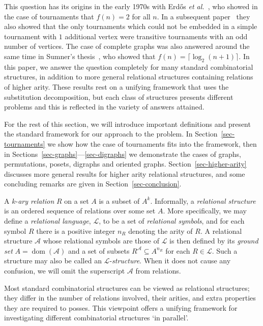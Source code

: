 \documentclass[11pt]{article}
\begin{document}
This question has its origins in the early 1970s with Erd\H{o}s {\itshape et al.}~\cite{erdos:some-remarks-on:}, who showed in the case of tournaments that $f(n)=2$ for all $n$. In a subsequent paper~\cite{erdos:simple-one-poin:} they also showed that the only tournaments which could not be embedded in a simple tournament with $1$ additional vertex were transitive tournaments with an odd number of vertices. The case of complete graphs was also answered around the same time in Sumner's thesis~\cite{sumner:indecomposable-:}, who showed that $f(n)=\lceil\log_2(n+1)\rceil$. In this paper, we answer the question completely for many standard combinatorial structures, in addition to more general relational structures containing relations of higher arity. These results rest on a unifying framework that uses the substitution decomposition, but each class of structures presents different problems and this is reflected in the variety of answers attained.

For the rest of this section, we will introduce important definitions and present the standard framework for our approach to the problem. In Section~\ref{sec-tournaments} we show how the case of tournaments fits into the framework, then in Sections~\ref{sec-graphs}---\ref{sec-digraphs} we demonstrate the cases of graphs, permutations, posets, digraphs and oriented graphs. Section~\ref{sec-higher-arity} discusses more general results for higher arity relational structures, and some concluding remarks are given in Section~\ref{sec-conclusion}.

A $k$-\emph{ary relation} $R$ on a set $A$ is a subset of $A^k$. Informally, a \emph{relational structure} is an ordered sequence of relations over some set $A$.
More specifically, we may define a \emph{relational language},
$\mathcal{L}$, to be a set of \emph{relational symbols}, and for each symbol $R$ there is a positive integer $n_R$ denoting the arity of $R$. A relational structure
$\mathcal{A}$ whose relational symbols are those of $\mathcal{L}$ is then
defined by its \emph{ground set} $A={\operatorname{dom}}(\mathcal{A})$ and a set of subsets
$R^\mathcal{A}\subseteq A^{n_R}$ for each $R\in
\mathcal{L}$. Such a structure may also be called an
$\mathcal{L}$-\emph{structure}. When it does not cause any confusion, we will omit the superscript $\mathcal{A}$ from relations.

Most standard combinatorial structures can be viewed as relational structures;
they differ in the number of relations involved, their arities, and extra properties they are required to posses. This viewpoint offers a unifying framework for investigating different combinatorial structures `in parallel'.
\end{document}
